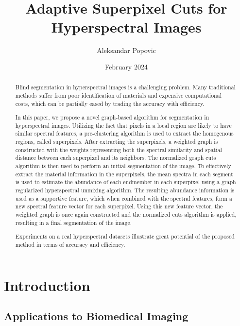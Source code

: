\documentclass[10pt]{article}
\title{Adaptive Superpixel Cuts for Hyperspectral Images}
\author{Aleksandar Popovic}
\date{February 2024}
\begin{document}
\maketitle

\begin{abstract}
    Blind segmentation in hyperspectral images is a challenging problem. Many traditional methods suffer from poor identification of materials and expensive computational costs, which can be partially eased by trading the accuracy with efficiency.

    In this paper, we propose a novel graph-based algorithm for segmentation in hyperspectral images. Utilizing the fact that pixels in a local region are likely to have similar spectral features, a pre-clustering algorithm is used to extract the homogenous regions, called superpixels. After extracting the superpixels, a weighted graph is constructed with the weights representing both the spectral similarity and spatial distance between each superpixel and its neighbors. The normalized graph cuts algorithm is then used to perform an initial segmentation of the image. To effectively extract the material information in the superpixels, the mean spectra in each segment is used to estimate the abundance of each endmember in each superpixel using a graph regularized hyperspectral unmixing algorithm. The resulting abundance information is used as a supportive feature, which when combined with the spectral features, form a new spectral feature vector for each superpixel. Using this new feature vector, the weighted graph is once again constructed and the normalized cuts algorithm is applied, resulting in a final segmentation of the image.

    Experiments on a real hyperspectral datasets illustrate great potential of the proposed method in terms of accuracy and efficiency.
\end{abstract}

\clearpage
% 
% 
% 
% 
% 
\tableofcontents

\clearpage
% 
% 
% 
% 
% 
\section{Introduction}

\subsection{Applications to Biomedical Imaging}
\end{document}

